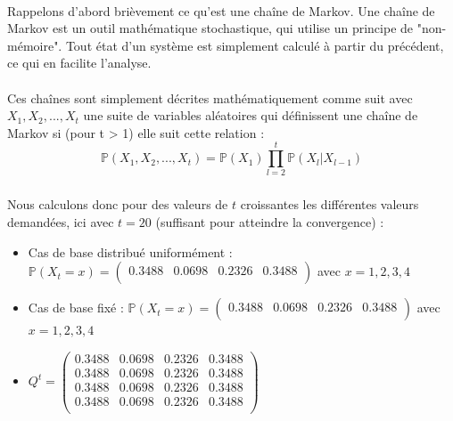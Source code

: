 \paragraph{}
Rappelons d'abord brièvement ce qu'est une chaîne de Markov. Une chaîne de Markov est un outil mathématique stochastique, qui utilise un principe de "non-mémoire". Tout état d'un système est simplement calculé à partir du précédent, ce qui en facilite l'analyse.
\\\\
Ces chaînes sont simplement décrites mathématiquement comme suit avec $X_1, X_2,..., X_t$ une suite de variables aléatoires qui définissent une chaîne de Markov
si (pour t > 1) elle suit cette relation :
\begin{equation*}
  \mathbb{P}(X_1, X_2, ..., X_t) = \mathbb{P}(X_1)\prod_{l = 2}^{t}\mathbb{P}(X_l | X_{l-1}) 
\end{equation*}

\subsubsection{}

Nous calculons donc pour des valeurs de $t$ croissantes les différentes valeurs demandées, ici avec $t = 20$ (suffisant pour atteindre la convergence) :
\begin{itemize}
  \item Cas de base distribué uniformément : $\mathbb{P}(X_t = x) = 
  \begin{pmatrix}
    0.3488 & 0.0698 & 0.2326 & 0.3488\\
  \end{pmatrix}$ avec $x = 1, 2, 3, 4$
  \item Cas de base fixé : $\mathbb{P}(X_t = x) = 
  \begin{pmatrix}
    0.3488 & 0.0698 & 0.2326 & 0.3488\\
  \end{pmatrix}$ avec $x = 1, 2, 3, 4$
  \item $Q^t = 
  \begin{pmatrix}
  0.3488 & 0.0698 & 0.2326 & 0.3488\\
  0.3488 & 0.0698 & 0.2326 & 0.3488\\
  0.3488 & 0.0698 & 0.2326 & 0.3488\\
  0.3488 & 0.0698 & 0.2326 & 0.3488\\
  \end{pmatrix}$ 
\end{itemize}

